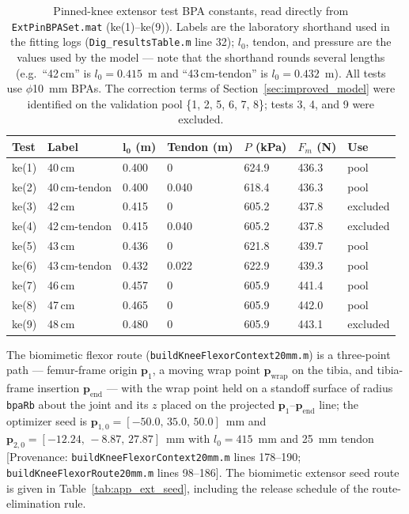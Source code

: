 \begin{table}[htbp]
\caption{Pinned-knee extensor test BPA constants, read directly from \texttt{ExtPinBPASet.mat} (ke(1)--ke(9)). Labels are the laboratory shorthand used in the fitting logs (\texttt{Dig\_resultsTable.m} line 32); $l_{0}$, tendon, and pressure are the values used by the model --- note that the shorthand rounds several lengths (e.g.\ ``42\,cm'' is $l_{0}=0.415$~m and ``43\,cm-tendon'' is $l_{0}=0.432$~m). All tests use $\phi$\qty{10}{\mm} BPAs. The correction terms of Section~\ref{sec:improved_model} were identified on the validation pool \{1, 2, 5, 6, 7, 8\}; tests 3, 4, and 9 were excluded.}
\label{tab:app_extpin_tests}
\begin{tabular}{@{}lllllll@{}}
\toprule
\textbf{Test} & \textbf{Label} & $\boldsymbol{l_{0}}$ (m) & Tendon (m) & $P$ (kPa) & $F_{m}$ (N) & \textbf{Use} \\
\midrule
ke(1) & 40\,cm          & 0.400 & 0     & 624.9 & 436.3 & pool \\
ke(2) & 40\,cm-tendon   & 0.400 & 0.040 & 618.4 & 436.3 & pool \\
ke(3) & 42\,cm          & 0.415 & 0     & 605.2 & 437.8 & excluded \\
ke(4) & 42\,cm-tendon   & 0.415 & 0.040 & 605.2 & 437.8 & excluded \\
ke(5) & 43\,cm          & 0.436 & 0     & 621.8 & 439.7 & pool \\
ke(6) & 43\,cm-tendon   & 0.432 & 0.022 & 622.9 & 439.3 & pool \\
ke(7) & 46\,cm          & 0.457 & 0     & 605.9 & 441.4 & pool \\
ke(8) & 47\,cm          & 0.465 & 0     & 605.9 & 442.0 & pool \\
ke(9) & 48\,cm          & 0.480 & 0     & 605.9 & 443.1 & excluded \\
\bottomrule
\end{tabular}
\end{table}

The biomimetic flexor route (\texttt{buildKneeFlexorContext20mm.m}) is a three-point path --- femur-frame origin $\mathbf{p}_{1}$, a moving wrap point $\mathbf{p}_{\text{wrap}}$ on the tibia, and tibia-frame insertion $\mathbf{p}_{\text{end}}$ --- with the wrap point held on a standoff surface of radius \texttt{bpaRb} about the joint and its $z$ placed on the projected $\mathbf{p}_{1}$--$\mathbf{p}_{\text{end}}$ line; the optimizer seed is $\mathbf{p}_{1,0} = [-50.0,\,35.0,\,50.0]$~mm and $\mathbf{p}_{2,0} = [-12.24,\,-8.87,\,27.87]$~mm with $l_{0} = 415$~mm and 25~mm tendon [Provenance: \texttt{buildKneeFlexorContext20mm.m} lines 178--190; \texttt{buildKneeFlexorRoute20mm.m} lines 98--186]. The biomimetic extensor seed route is given in Table~\ref{tab:app_ext_seed}, including the release schedule of the route-elimination rule.

